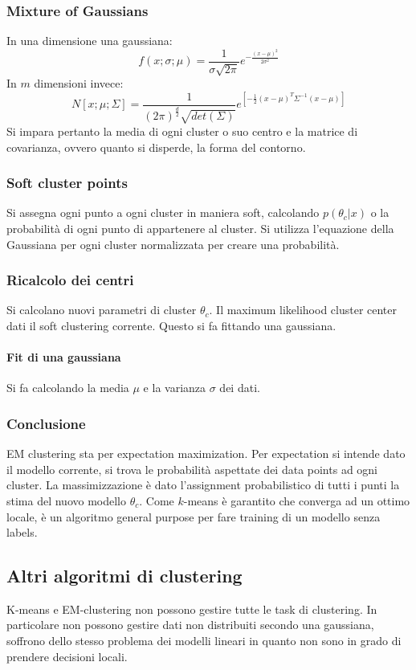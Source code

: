 		\subsubsection{Mixture of Gaussians}
		In una dimensione una gaussiana:
		$$f(x;\sigma;\mu) = \frac{1}{\sigma\sqrt{2\pi}}e^{-\frac{(x-\mu)^2}{2\sigma^2}}$$
		In $m$ dimensioni invece:
		$$N[x;\mu;\Sigma] = \frac{1}{(2\pi)^{\frac{d}{2}}\sqrt{det(\Sigma)}}e^{[-\frac{1}{2}(x-\mu)^T\Sigma^{-1}(x-\mu)]}$$
		Si impara pertanto la media di ogni cluster o suo centro e la matrice di covarianza, ovvero quanto si disperde, la forma del contorno.
		
		\subsubsection{Soft cluster points}
		Si assegna ogni punto a ogni cluster in maniera soft, calcolando $p(\theta_c|x)$ o la probabilit\`a di ogni punto di appartenere al cluster.
		Si utilizza l'equazione della Gaussiana per ogni cluster normalizzata per creare una probabilit\`a.
		
		\subsubsection{Ricalcolo dei centri}
		Si calcolano nuovi parametri di cluster $\theta_c$.
		Il maximum likelihood cluster center dati il soft clustering corrente.
		Questo si fa fittando una gaussiana.
		
		\paragraph{Fit di una gaussiana}
		Si fa calcolando la media $\mu$ e la varianza $\sigma$ dei dati.
		
		\subsubsection{Conclusione}
		EM clustering sta per expectation maximization.
		Per expectation si intende dato il modello corrente, si trova le probabilit\`a aspettate dei data points ad ogni cluster.
		La massimizzazione \`e dato l'assignment probabilistico di tutti i punti la stima del nuovo modello $\theta_c$.
		Come $k$-means \`e garantito che converga ad un ottimo locale, \`e un algoritmo general purpose per fare training di un modello senza labels.

	\subsection{Altri algoritmi di clustering}
	K-means e EM-clustering non possono gestire tutte le task di clustering.
	In particolare non possono gestire dati non distribuiti secondo una gaussiana, soffrono dello stesso problema dei modelli lineari in quanto non sono in grado di prendere decisioni locali.

